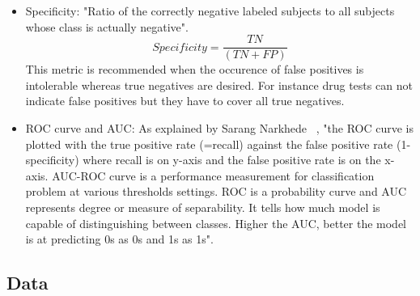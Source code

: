 \begin{itemize}
\item Specificity: "Ratio of the correctly negative labeled subjects to all subjects whose class is actually negative".
\begin{equation}
Specificity = \frac{TN}{(TN + FP)}
\end{equation}
This metric is recommended when the occurence of false positives is intolerable whereas true negatives are desired. For instance drug tests can not indicate false positives but they have to cover all true negatives.
\item ROC curve and AUC:
As explained by Sarang Narkhede ~\cite{26}, "the ROC curve is plotted with the true positive rate (=recall) against the false positive rate (1-specificity) where recall is on y-axis and the false positive rate is on the x-axis. AUC-ROC curve is a performance measurement for classification problem at various thresholds settings. ROC is a probability curve and AUC represents degree or measure of separability. It tells how much model is capable of distinguishing between classes. Higher the AUC, better the model is at predicting 0s as 0s and 1s as 1s".

\end{itemize}




\subsection{Data}

